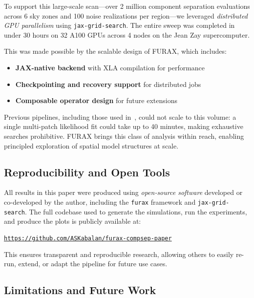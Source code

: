 \documentclass[%
 reprint,
bibnotes,
 amsmath,amssymb,
 aps,
floatfix, 
]{revtex4-2}
\begin{document}
To support this large-scale scan---over 2 million component separation evaluations across 6 sky zones and 100 noise realizations per region---we leveraged \textit{distributed GPU parallelism} using \texttt{jax-grid-search}. The entire sweep was completed in under 30 hours on 32 A100 GPUs across 4 nodes on the Jean Zay supercomputer.

This was made possible by the scalable design of \textsc{FURAX}, which includes:
\begin{itemize}
    \item \textbf{JAX-native backend} with XLA compilation for performance
    \item \textbf{Checkpointing and recovery support} for distributed jobs
    \item \textbf{Composable operator design} for future extensions
\end{itemize}

Previous pipelines, including those used in~\cite{LiteBIRD_PTEP_2022}, could not scale to this volume: a single multi-patch likelihood fit could take up to 40 minutes, making exhaustive searches prohibitive. \textsc{FURAX} brings this class of analysis within reach, enabling principled exploration of spatial model structures at scale.

\subsection*{Reproducibility and Open Tools}

All results in this paper were produced using \textit{open-source software} developed or co-developed by the author, including the \texttt{furax} framework and \texttt{jax-grid-search}. The full codebase used to generate the simulations, run the experiments, and produce the plots is publicly available at:

\begin{center}
\texttt{\href{https://github.com/ASKabalan/furax-compsep-paper}{https://github.com/ASKabalan/furax-compsep-paper}}
\end{center}

This ensures transparent and reproducible research, allowing others to easily re-run, extend, or adapt the pipeline for future use cases.

\subsection*{Limitations and Future Work}
\end{document}
